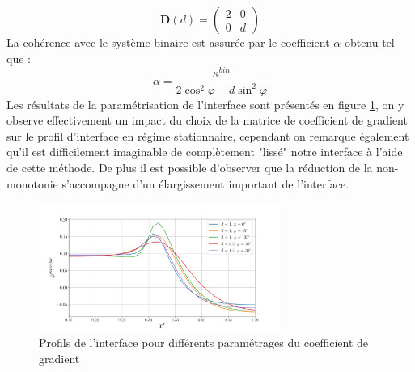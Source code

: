 \begin{equation}
	\bm{D}(d) =    \begin{pmatrix} 
	2 & 0 \\ 
	0 & d
	\end{pmatrix} 
\end{equation}
La cohérence avec le système binaire est assurée par le coefficient $\alpha$ obtenu tel que :
\begin{equation}
\alpha = \frac{\kappa^{bin}}{2\cos^2\varphi + d \sin^2\varphi}
\end{equation}
Les résultats de la paramétrisation de l'interface sont présentés en figure \ref{fig:profinterfacekappa}, on y observe effectivement un impact du choix de la matrice de coefficient de gradient sur le profil d'interface en régime stationnaire, cependant on remarque également qu'il est difficilement imaginable de complètement "lissé" notre interface à l'aide de cette méthode. De plus il est possible d'observer que la réduction de la non-monotonie s'accompagne d'un élargissement important de l'interface.
\begin{figure}[H]
		\centering
		\includegraphics[width=0.7\textwidth]{figure/ProfInterfStatio2.png}
		\caption{Profils de l'interface pour différents paramétrages du coefficient de gradient}
		\label{fig:profinterfacekappa}
\end{figure}

